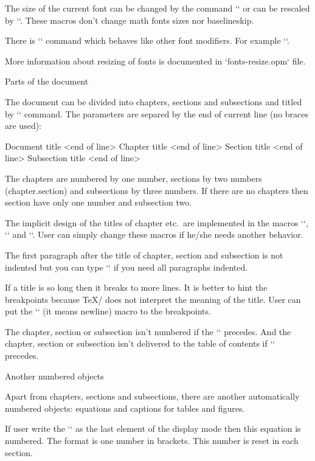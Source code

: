 The size of the current font can be changed by the command
`` or can be rescaled by
`\thefontscale[<factor>]`. These macros don't change math fonts sizes nor
baselineskip.

\new
There is `` command which behaves like other
font modifiers. For example `\currvar`.

More information about resizing of fonts is documented in `fonts-resize.opm`
file. 


\sec Parts of the document

The document can be divided into chapters, sections and subsections and titled
by `\tit` command. The parameters are separed by the end of current line (no
braces are used):

\begtt
\tit Document title <end of line>
\chap Chapter title <end of line>
\sec Section title <end of line>
\secc Subsection title <end of line>
\endtt

The chapters are numbered by one number, sections by two numbers
(chapter.section) and subsections by three numbers. If there are no chapters
then section have only one number and subsection two.

The implicit design of the titles of chapter etc.\ are implemented in the
macros `\printchap`, `\printsec` and `\printsecc`. User can simply change
these macros if he/she needs another behavior.

The first paragraph after the title of chapter, section and subsection is
not indented but you can type `\let\firstnoindent=\relax` if you need all
paragraphs indented.

If a title is so long then it breaks to more lines. It is better to hint the
breakpoints because \TeX/ does not interpret the meaning of the title.
User can put the `\nl` (it means newline) macro to the breakpoints.

The chapter, section or subsection isn't numbered if the `\nonum` precedes.
And the chapter, section or subsection isn't delivered to the table of
contents if `\notoc` precedes.


\sec Another numbered objects

Apart from chapters, sections and subsections, there are another
automatically numbered objects: equations and captions for tables and
figures.

If user write the `\eqmark` as the last element of the display mode then
this equation is numbered. The format is one number in brackets. This number
is reset in each section. 

